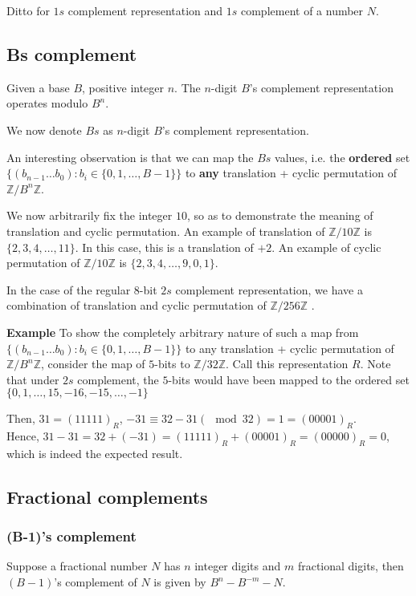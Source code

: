 \documentclass{article}
\begin{document}
Ditto for $1s$ complement representation and $1s$ complement of a number $N$.

\subsection{Bs complement}
Given a base $B$, positive integer $n$. The $n$-digit $B$'s complement representation operates modulo $B^n$.

We now denote $Bs$ as $n$-digit $B$'s complement representation.

An interesting observation is that we can map the $Bs$ values, i.e. the \textbf{ordered} set $\{(b_{n-1}\dots b_0) : b_i\in \{0, 1, \dots, B-1\}\}$ to \textbf{any} translation + cyclic permutation of $\mathbb{Z}/B^{n}\mathbb{Z}$.

We now arbitrarily fix the integer $10$, so as to demonstrate the meaning of translation and cyclic permutation.
An example of translation of $\mathbb{Z}/10\mathbb{Z}$ is $\{2,3,4,\dots, 11\}$. In this case, this is a translation of $+2$. An example of cyclic permutation of $\mathbb{Z}/10\mathbb{Z}$ is $\{2,3,4,\dots, 9, 0, 1\}$.

In the case of the regular $8$-bit $2s$ complement representation, we have a combination of translation and cyclic permutation of $\mathbb{Z}/256\mathbb{Z}$ .

\textbf{Example} To show the completely arbitrary nature of such a map from $\{(b_{n-1}\dots b_0) : b_i\in \{0, 1, \dots, B-1\}\}$ to any translation + cyclic permutation of $\mathbb{Z}/B^{n}\mathbb{Z}$, consider the map of $5$-bits to $\mathbb{Z}/32\mathbb{Z}$. Call this representation $R$. Note that under $2s$ complement, the $5$-bits would have been mapped to the ordered set $\{0, 1, \dots, 15, -16, -15, \dots, -1\}$

Then, $31 = (11111)_R$, $-31 \equiv 32 - 31 (\mod 32) = 1 = (00001)_R$.\\
Hence, $31 - 31 = 32 + (-31) = (11111)_R + (00001)_R = (00000)_R = 0$, which is indeed the expected result.

\subsection{Fractional complements}
\subsubsection{(B-1)'s complement}
Suppose a fractional number $N$ has $n$ integer digits and $m$ fractional digits, then $(B-1)$'s complement of $N$ is given by $B^n-B^{-m}-N$.
\end{document}

